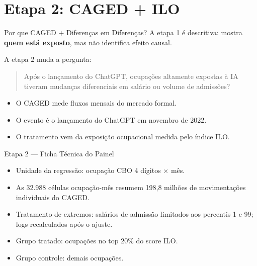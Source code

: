 \documentclass[
  ignorenonframetext,
  aspectratio=169,
]{beamer}
\providecommand{\tightlist}{%
  \setlength{\itemsep}{0pt}\setlength{\parskip}{0pt}}
\begin{document}
\section{Etapa 2: CAGED + ILO}\label{etapa-2-caged-ilo}

\begin{frame}{Por que CAGED + Diferenças em Diferenças?}
\label{por-que-caged-diferenuxe7as-em-diferenuxe7as}
A etapa 1 é descritiva: mostra \textbf{quem está exposto}, mas não
identifica efeito causal.

A etapa 2 muda a pergunta:

\begin{quote}
Após o lançamento do ChatGPT, ocupações altamente expostas à IA tiveram
mudanças diferenciais em salário ou volume de admissões?
\end{quote}

\begin{itemize}
\tightlist
\item
  O CAGED mede fluxos mensais do mercado formal.
\item
  O evento é o lançamento do ChatGPT em novembro de 2022.
\item
  O tratamento vem da exposição ocupacional medida pelo índice ILO.
\end{itemize}
\end{frame}

\begin{frame}{Etapa 2 --- Ficha Técnica do Painel}
\label{etapa-2-ficha-tuxe9cnica-do-painel}
\begin{center}
\resizebox{0.78\textwidth}{!}{}
\end{center}

\vspace{0.2cm}

\begin{itemize}
\tightlist
\item
  Unidade da regressão: ocupação CBO 4 dígitos × mês.
\item
  As 32.988 células ocupação-mês resumem 198,8 milhões de movimentações
  individuais do CAGED.
\item
  Tratamento de extremos: salários de admissão limitados aos percentis 1
  e 99; logs recalculados após o ajuste.
\item
  Grupo tratado: ocupações no top 20\% do score ILO.
\item
  Grupo controle: demais ocupações.
\end{itemize}
\end{frame}
\end{document}
